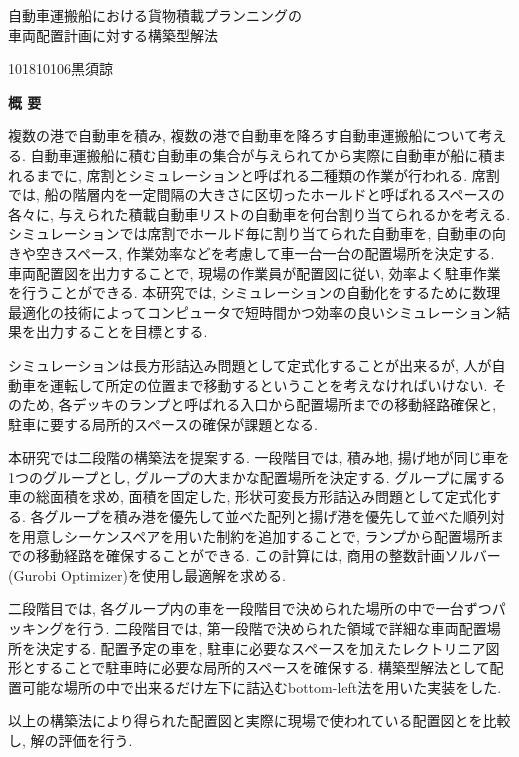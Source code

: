 \begin{center}
{\LARGE 自動車運搬船における貨物積載プランニングの\\車両配置計画に対する構築型解法}\\[0.5cm]
\end{center}
\hfill
{\large 101810106\qquad 黒須諒}\\[0.5cm]
\begin{center}
{\Large \bf 概 要}\\
\end{center}

複数の港で自動車を積み, 複数の港で自動車を降ろす自動車運搬船について考える. 
自動車運搬船に積む自動車の集合が与えられてから実際に自動車が船に積まれるまでに, 席割とシミュレーションと呼ばれる二種類の作業が行われる. 
席割では, 船の階層内を一定間隔の大きさに区切ったホールドと呼ばれるスペースの各々に, 与えられた積載自動車リストの自動車を何台割り当てられるかを考える. 
シミュレーションでは席割でホールド毎に割り当てられた自動車を, 自動車の向きや空きスペース, 作業効率などを考慮して車一台一台の配置場所を決定する. 
車両配置図を出力することで, 現場の作業員が配置図に従い, 効率よく駐車作業を行うことができる. 
本研究では, シミュレーションの自動化をするために数理最適化の技術によってコンピュータで短時間かつ効率の良いシミュレーション結果を出力することを目標とする. 

シミュレーションは長方形詰込み問題として定式化することが出来るが, 人が自動車を運転して所定の位置まで移動するということを考えなければいけない. 
そのため, 各デッキのランプと呼ばれる入口から配置場所までの移動経路確保と, 駐車に要する局所的スペースの確保が課題となる. 

本研究では二段階の構築法を提案する. 
一段階目では, 積み地, 揚げ地が同じ車を1つのグループとし, グループの大まかな配置場所を決定する. 
グループに属する車の総面積を求め, 面積を固定した, 形状可変長方形詰込み問題として定式化する. 
各グループを積み港を優先して並べた配列と揚げ港を優先して並べた順列対を用意しシーケンスペアを用いた制約を追加することで, ランプから配置場所までの移動経路を確保することができる. 
この計算には, 商用の整数計画ソルバー(Gurobi Optimizer)を使用し最適解を求める. 

二段階目では, 各グループ内の車を一段階目で決められた場所の中で一台ずつパッキングを行う. 
二段階目では, 第一段階で決められた領域で詳細な車両配置場所を決定する. 
配置予定の車を, 駐車に必要なスペースを加えたレクトリニア図形とすることで駐車時に必要な局所的スペースを確保する. 
構築型解法として配置可能な場所の中で出来るだけ左下に詰込むbottom-left法を用いた実装をした. 

以上の構築法により得られた配置図と実際に現場で使われている配置図とを比較し, 解の評価を行う. 
